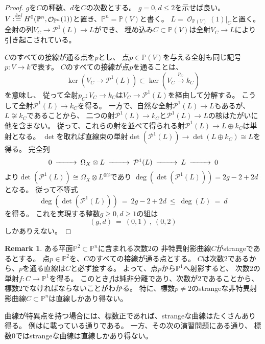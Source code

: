 \documentclass[uplatex]{jsarticle}
\theoremstyle{definition}
\newtheorem{rem}[rem]{Remark}
\renewcommand{\P}{\mathbb{P}}
\newcommand{\mcO}{\mathcal{O}}
\newcommand{\mcP}{\mathcal{P}}
\DeclareMathOperator{\OOO}{\mcO}
\newcommand{\OO}[1]{\OOO_{#1}}
\def\dfn{:\overset{\mbox{{\scriptsize def}}}{=}}
\begin{document}
\begin{proof}
  \(g\)を\(C\)の種数、\(d\)を\(C\)の次数とする。
  \(g = 0,d\leq 2\)を示せば良い。
  \(V\dfn H^0(\P^n,\OO{\P^n}(1))\)と置き、\(\P^n=\P(V)\)と書く。
  \(L = \OO{\P(V)}(1)|_C\)と置く。
  全射の列\(V_C\to \mcP^1(L) \to L\)ができ、
  埋め込み\(C\subset \P(V)\)は全射\(V_C\to L\)により引き起こされている。

  \(C\)のすべての接線が通る点を\(p\)とし、
  点\(p\in \P(V)\)を与える全射も同じ記号\(p:V\to k\)で表す。
  \(C\)のすべての接線が点\(p\)を通ることは、
  \[\ker(V_C\to \mcP^1(L)) \subset \ker(V_C\xrightarrow{p_C} k_C)\]
  を意味し、
  従って全射\(p_C : V_C\to k_C\)は\(V_C\to \mcP^1(L)\)を経由して分解する。
  こうして全射\(\mcP^1(L)\to k_C\)を得る。
  一方で、自然な全射\(\mcP^1(L)\to L\)もあるが、
  \(L\not\cong k_C\)であることから、
  二つの射\(\mcP^1(L)\to k_C\)と\(\mcP^1(L)\to L\)の核はたがいに他を含まない。
  従って、これらの射を並べて得られる射\(\mcP^1(L) \to L\oplus k_C\)は単射となる。
  \(\det\)を取れば直線束の単射\(\det(\mcP^1(L)) \to \det(L\oplus k_C) \cong L\)を得る。
  完全列
  \[
  \begin{CD}
    0 @>>> \Omega_X\otimes L @>>> \mcP^1(L) @>>> L @>>> 0
  \end{CD}
  \]
  より\(\det(\mcP^1(L)) \cong \Omega_X \otimes L^{\otimes 2}\)であり
  \(\deg(\det(\mcP^1(L))) = 2g - 2 + 2d\)となる。
  従って不等式
  \[
  \deg(\det(\mcP^1(L))) \ = \ 2g - 2 + 2d \ \leq \ \deg(L) \ = \ d
  \]
  を得る。
  これを実現する整数\(g\geq 0, d\geq 1\)の組は
  \[
  (g,d) \ = \ (0,1) \ , \ (0,2)
  \]
  しかありえない。
\end{proof}


\begin{rem}
  ある平面\(\P^2\subset \P^n\)に含まれる次数\(2\)の
  非特異射影曲線\(C\)がstrangeであるとする。
  点\(p\in \P^2\)を、\(C\)のすべての接線が通る点とする。
  \(C\)は次数\(2\)であるから、\(p\)を通る直線は\(C\)と必ず接する。
  よって、点\(p\)から\(\P^1\)へ射影すると、
  次数\(2\)の単射\(f:C\to \P^1\)を得る。
  このとき\(f\)は純非分離であり、次数が\(2\)であることから、
  標数\(2\)でなければならないことがわかる。
  特に、標数\(p\neq 2\)のstrangeな非特異射影曲線\(C\subset \P^n\)は直線しかあり得ない。
\end{rem}



曲線が特異点を持つ場合には、標数正であれば、strangeな曲線はたくさんあり得る。
例は\cite[演習 IV.3.8.(a)]{Ha}に載っている通りである。
一方、その次の演習問題\cite[演習 IV.3.8.(b)]{Ha}にある通り、
標数\(0\)ではstrangeな曲線は直線しかあり得ない。
\end{document}
